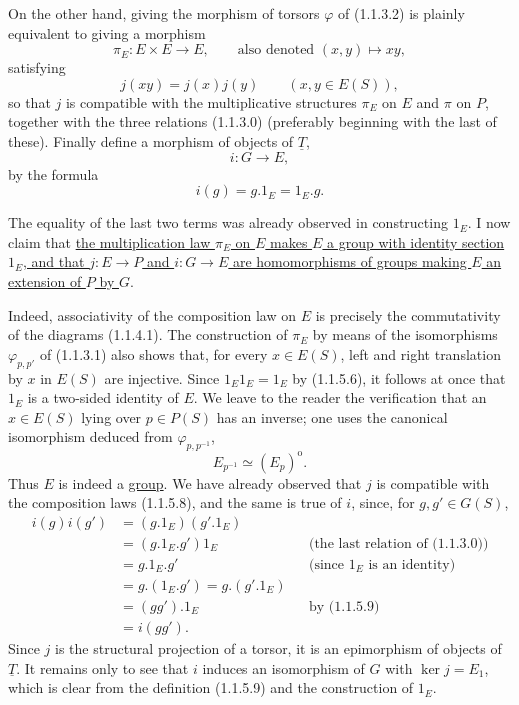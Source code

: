On the other hand, giving the morphism of torsors $\varphi$ of
(1.1.3.2) is plainly equivalent to giving a morphism
\begin{equation}\tag{1.1.5.7}
 \pi_E:E\times E\longrightarrow E,
 \qquad\text{also denoted }(x,y)\longmapsto xy,
\end{equation}
satisfying
\begin{equation}\tag{1.1.5.8}
 j(xy)=j(x)j(y)\qquad(x,y\in E(S)),
\end{equation}
so that $j$ is compatible with the multiplicative structures $\pi_E$
on $E$ and $\pi$ on $P$, together with the three relations (1.1.3.0)
(preferably beginning with the last of these). Finally define a morphism
of objects of $\underline T$,
\[
 i:G\longrightarrow E,
\]
by the formula
\begin{equation}\tag{1.1.5.9}
 i(g)=g.1_E=1_E.g.
\end{equation}


The equality of the last two terms was already observed in constructing
$1_E$. I now claim that \underline{the multiplication law $\pi_E$ on
$E$ makes $E$ a group with identity section $1_E$, and that
$j:E\longrightarrow P$ and $i:G\longrightarrow E$ are homomorphisms of
groups making $E$ an extension of $P$ by $G$}.

Indeed, associativity of the composition law on $E$ is precisely the
commutativity of the diagrams (1.1.4.1). The construction of $\pi_E$ by
means of the isomorphisms $\varphi_{p,p'}$ of (1.1.3.1) also shows that,
for every $x\in E(S)$, left and right translation by $x$ in $E(S)$ are
injective. Since $1_E1_E=1_E$ by (1.1.5.6), it follows at once that
$1_E$ is a two-sided identity of $E$. We leave to the reader the
verification that an $x\in E(S)$ lying over $p\in P(S)$ has an inverse;
one uses the canonical isomorphism deduced from $\varphi_{p,p^{-1}}$,
\begin{equation}\tag{1.1.5.10}
 E_{p^{-1}}\simeq(E_p)^{\mathrm o}.
\end{equation}
Thus $E$ is indeed a \underline{group}. We have already observed that
$j$ is compatible with the composition laws (1.1.5.8), and the same is
true of $i$, since, for $g,g'\in G(S)$,
\begin{align*}
 i(g)i(g')
 &= (g.1_E)(g'.1_E)\\
 &= (g.1_E.g')1_E &&\text{(the last relation of (1.1.3.0))}\\
 &= g.1_E.g' &&\text{(since $1_E$ is an identity)}\\
 &= g.(1_E.g')=g.(g'.1_E)\\
 &= (gg').1_E &&\text{by (1.1.5.9)}\\
 &= i(gg').
\end{align*}
Since $j$ is the structural projection of a torsor, it is an
epimorphism of objects of $\underline T$. It remains only to see that
$i$ induces an isomorphism of $G$ with $\ker j=E_1$, which is clear from
the definition (1.1.5.9) and the construction of $1_E$.

